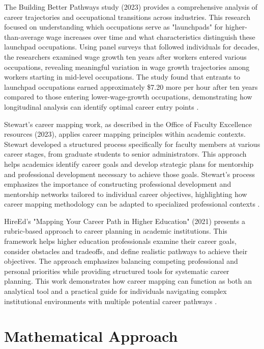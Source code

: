 \documentclass{article}
\begin{document}
The Building Better Pathways study (2023) provides a comprehensive analysis of career trajectories and occupational transitions across industries. This research focused on understanding which occupations serve as "launchpads" for higher-than-average wage increases over time and what characteristics distinguish these launchpad occupations. Using panel surveys that followed individuals for decades, the researchers examined wage growth ten years after workers entered various occupations, revealing meaningful variation in wage growth trajectories among workers starting in mid-level occupations. The study found that entrants to launchpad occupations earned approximately \$7.20 more per hour after ten years compared to those entering lower-wage-growth occupations, demonstrating how longitudinal analysis can identify optimal career entry points \citep{workforcegps2023}.

Stewart's career mapping work, as described in the Office of Faculty Excellence resources (2023), applies career mapping principles within academic contexts. Stewart developed a structured process specifically for faculty members at various career stages, from graduate students to senior administrators. This approach helps academics identify career goals and develop strategic plans for mentorship and professional development necessary to achieve those goals. Stewart's process emphasizes the importance of constructing professional development and mentorship networks tailored to individual career objectives, highlighting how career mapping methodology can be adapted to specialized professional contexts \citep{ncsu2023}.

HireEd's "Mapping Your Career Path in Higher Education" (2021) presents a rubric-based approach to career planning in academic institutions. This framework helps higher education professionals examine their career goals, consider obstacles and tradeoffs, and define realistic pathways to achieve their objectives. The approach emphasizes balancing competing professional and personal priorities while providing structured tools for systematic career planning. This work demonstrates how career mapping can function as both an analytical tool and a practical guide for individuals navigating complex institutional environments with multiple potential career pathways \citep{hireed2021}.

\section{Mathematical Approach}
\end{document}
